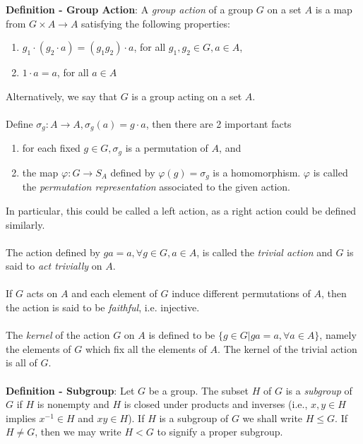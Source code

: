 \documentclass{article}
\begin{document}
\textbf{Definition - Group Action}: A \textit{group action} of a group $G$ on a set $A$ is a map from $G \times A \rightarrow A$ satisfying the following properties: \begin{enumerate}
    \item $g_1 \cdot (g_2 \cdot a) = (g_1g_2) \cdot a$, for all $g_1, g_2 \in G, a \in A$,
    \item $1 \cdot a = a$, for all $a \in A$
\end{enumerate} $ $ \\
Alternatively, we say that $G$ is a group acting on a set $A$. \\ \\
Define $\sigma_g: A \rightarrow A, \sigma_g(a) = g \cdot a$, then there are 2 important facts \begin{enumerate}
    \item for each fixed $g \in G, \sigma_g$ is a permutation of $A$, and
    \item the map $\varphi: G \rightarrow S_A$ defined by $\varphi(g) = \sigma_g$ is a homomorphism. $\varphi$ is called the \textit{permutation representation} associated to the given action.
\end{enumerate} $ $ \\
In particular, this could be called a left action, as a right action could be defined similarly. \\ \\
The action defined by $ga = a, \forall g \in G, a \in A$, is called the \textit{trivial action} and $G$ is said to \textit{act trivially} on $A$. \\ \\
If $G$ acts on $A$ and each element of $G$ induce different permutations of $A$, then the action is said to be \textit{faithful}, i.e. injective. \\ \\
The \textit{kernel} of the action $G$ on $A$ is defined to be $\{g \in G | ga = a, \forall a \in A\}$, namely the elements of $G$ which fix all the elements of $A$. The kernel of the trivial action is all of $G$. \\ \\
\textbf{Definition - Subgroup}: Let $G$ be a group. The subset $H$ of $G$ is a \textit{subgroup} of $G$ if $H$ is nonempty and $H$ is closed under products and inverses (i.e., $x, y \in H$ implies $x^{-1} \in H$ and $xy \in H$). If $H$ is a subgroup of $G$ we shall write $H \leq G$. If $H \neq G$, then we may write $H < G$ to signify a proper subgroup. \\ \\
\end{document}
